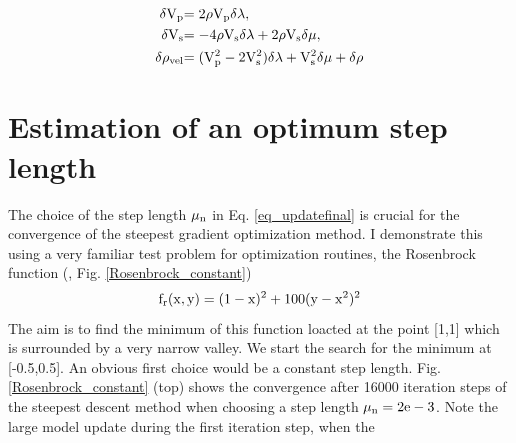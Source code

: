 \begin{equation}
\begin{split}
\rm{\delta V_p} & \rm{= 2 \rho V_p \delta \lambda,}\\
\rm{\delta V_s} & \rm{= - 4 \rho V_s \delta \lambda + 2 \rho V_s \delta \mu,}\\
\rm{\delta \rho_{vel}} & \rm{= (V_p^2 - 2 V_s^2) \delta \lambda + V_s^2 \delta \mu + \delta \rho}\\
\end{split}
\label{2:54}
\end{equation}

\section{Estimation of an optimum step length}\label{optimum_step_length} %
The choice of the step length $\rm{\mu_n}$ in Eq. \ref{eq_updatefinal} is crucial for the convergence of the steepest gradient optimization method. I demonstrate this using a very familiar test problem for optimization routines, the Rosenbrock function (\cite{rosenbrock:60}, Fig. \ref{Rosenbrock_constant})
\begin{equation}
\rm{f_r(x,y) = (1-x)^2 + 100 (y-x^2)^2}
\label{rosenbrock}
\end{equation}
The aim is to find the minimum of this function loacted at the point [1,1] which is surrounded by a very narrow valley. We start the search for the minimum at [-0.5,0.5]. An obvious first choice would be a constant step length. Fig. \ref{Rosenbrock_constant} (top) shows the convergence after 16000 iteration steps of the steepest descent method when choosing a step length $\rm{\mu_n=2e-3}$. Note the large model update during the first iteration step, when the 

